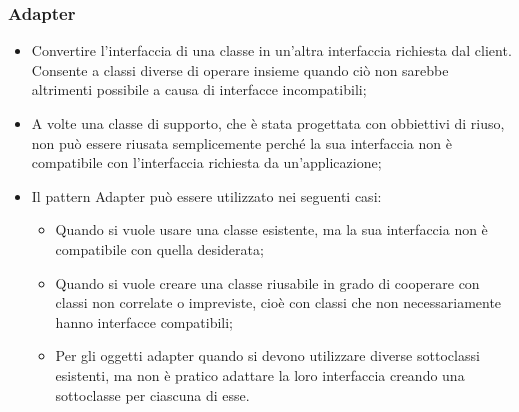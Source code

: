 \subsubsection{Adapter} 
\begin{itemize}
\item {} Convertire l'interfaccia di una classe in un'altra interfaccia richiesta dal client. Consente a classi diverse di operare insieme quando ciò non sarebbe altrimenti possibile a causa di interfacce incompatibili;
\item {} A volte una classe di supporto, che è stata progettata con obbiettivi di riuso, non può essere riusata semplicemente perché la sua interfaccia non è compatibile con l'interfaccia richiesta da un'applicazione;
\item {} Il pattern Adapter può essere utilizzato nei seguenti casi:
\begin{itemize}
\item Quando si vuole usare una classe esistente, ma la sua interfaccia non è compatibile con quella desiderata;
\item Quando si vuole creare una classe riusabile in grado di cooperare con classi non correlate o impreviste, cioè con classi che non necessariamente hanno interfacce compatibili;
\item Per gli oggetti adapter quando si devono utilizzare diverse sottoclassi esistenti, ma non è pratico adattare la loro interfaccia creando una sottoclasse per ciascuna di esse.
\end{itemize}
\end{itemize}

